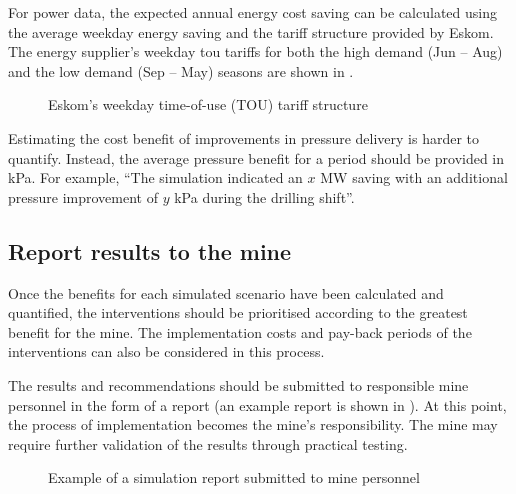 		For power data, the expected annual energy cost saving can be calculated using the average weekday energy saving and the tariff structure provided by Eskom. The energy supplier's weekday \gls{tou} tariffs for both the high demand (Jun -- Aug) and the low demand (Sep -- May) seasons are shown in .
		\par 
		\begin{figure}[h]
			\centering
			
			\caption[Eskom's weekday TOU tariff structure]{Eskom's weekday time-of-use (TOU) tariff structure\protect \footnotemark[1]}
			\label{fig: Tariff}
		\end{figure}
		
		Estimating the cost benefit of improvements in pressure delivery is harder to quantify. Instead, the average pressure benefit for a period should be provided in kPa. For example, \enquote{The simulation indicated an $x$ MW saving with an additional pressure improvement of $y$ kPa during the drilling shift}.

		\subsection{Report results to the mine}
		Once the benefits for each simulated scenario have been calculated and quantified, the interventions should be prioritised according to the greatest benefit for the mine. The implementation costs and pay-back periods of the interventions can also be considered in this process.
		\par
		The results and recommendations should be submitted to responsible mine personnel in the form of a report (an example report is shown in ). At this point, the process of implementation becomes the mine's responsibility. The mine may require further validation of the results through practical testing.
		\begin{figure}[h]
			\centering
			\caption{Example of a simulation report submitted to mine personnel}
			\label{fig: Report example}
		\end{figure}

